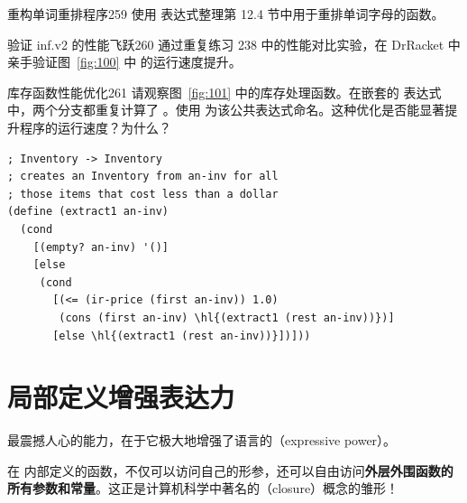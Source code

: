 \begin{exercise}{重构单词重排程序}{259}
使用  表达式整理第 12.4 节中用于重排单词字母的函数。
\end{exercise}

\begin{exercise}{验证 inf.v2 的性能飞跃}{260}
通过重复练习 238 中的性能对比实验，在 DrRacket 中亲手验证图~\ref{fig:100} 中  的运行速度提升。
\end{exercise}

\begin{exercise}{库存函数性能优化}{261}
请观察图~\ref{fig:101} 中的库存处理函数。在嵌套的  表达式中，两个分支都重复计算了 。使用  为该公共表达式命名。这种优化是否能显著提升程序的运行速度？为什么？

\begin{stepperbox}
\begin{Verbatim}[commandchars=\\\{\}, fontsize=\scriptsize]
; Inventory -> Inventory
; creates an Inventory from an-inv for all
; those items that cost less than a dollar
(define (extract1 an-inv)
  (cond
    [(empty? an-inv) '()]
    [else
     (cond
       [(<= (ir-price (first an-inv)) 1.0)
        (cons (first an-inv) \hl{(extract1 (rest an-inv))})]
       [else \hl{(extract1 (rest an-inv))}])]))
\end{Verbatim}
\end{stepperbox}
\label{fig:101}
\end{exercise}

\section{局部定义增强表达力}
\label{sec:16_3}

 最震撼人心的能力，在于它极大地增强了语言的（expressive power）。

在  内部定义的函数，不仅可以访问自己的形参，还可以自由访问\textbf{外层外围函数的所有参数和常量}。这正是计算机科学中著名的（closure）概念的雏形！

